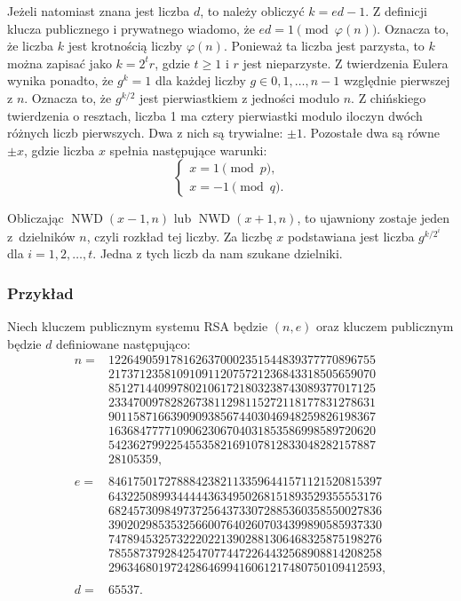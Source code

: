 \documentclass[12pt,twoside,a4]{mwbk}
\theoremstyle{definition}
\DeclareMathOperator{\NWD}{NWD}
\begin{document}


Jeżeli natomiast znana jest liczba $d$, to należy obliczyć $k = ed - 1$. Z definicji klucza publicznego i prywatnego wiadomo, że $ed = 1 \pmod{\varphi(n)}$. Oznacza to, że liczba $k$ jest krotnością liczby $\varphi(n)$. Ponieważ ta liczba jest parzysta, to $k$ można zapisać jako $k = 2^tr$, gdzie $t\geq1$ i $r$ jest nieparzyste. Z twierdzenia Eulera wynika ponadto, że $g^k = 1$ dla każdej liczby $g \in {0,1,\ldots,n-1}$ względnie pierwszej z $n$. Oznacza to, że $g^{k/2}$ jest pierwiastkiem z jedności modulo $n$. Z chińskiego twierdzenia o resztach, liczba 1 ma cztery pierwiastki modulo iloczyn dwóch różnych liczb pierwszych. Dwa z nich są trywialne: $\pm1$. Pozostałe dwa są równe $\pm x$, gdzie liczba $x$ spełnia następujące warunki:
\[ \left\{ \begin{array}{c} x = 1 \pmod{p}, \\ x = -1 \pmod{q}. \end{array}\right. \]

Obliczając $\NWD(x-1,n)$ lub $\NWD(x+1,n)$, to ujawniony zostaje jeden z~dzielników $n$, czyli rozkład tej liczby. Za liczbę $x$ podstawiana jest liczba $g^{k / 2^i}$ dla $i = 1,2,\ldots,t$. Jedna z tych liczb da nam szukane dzielniki.

\subsubsection{Przykład}
Niech kluczem publicznym systemu RSA będzie $(n,e)$ oraz kluczem publicznym będzie $d$ definiowane następująco:
\begin{align*} n = &1226490591781626370002351544839377770896755 \\
&2173712358109109112075721236843318505659070 \\
&8512714409978021061721803238743089377017125 \\
&2334700978282673811298115272118177831278631 \\
&9011587166390909385674403046948259826198367 \\
&1636847777109062306704031853586998589720620 \\
&5423627992254553582169107812833048282157887 \\
&28105359, \\ \\
e = &84617501727888423821133596441571121520815397 \\
&64322508993444443634950268151893529355553176 \\
&68245730984973725643733072885360358550027836 \\
&39020298535325660076402607034399890585937330 \\
&74789453257322202213902881306468325875198276 \\
&78558737928425470774472264432568908814208258 \\
&29634680197242864699416061217480750109412593, \\ \\
d = &65537.
\end{align*}
\end{document}
